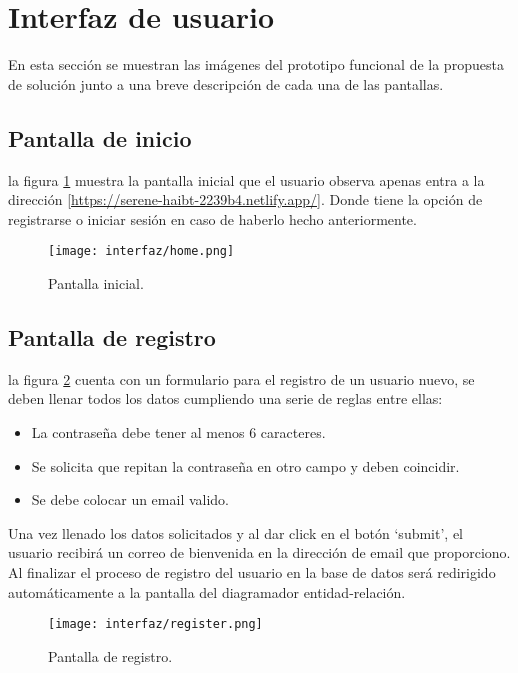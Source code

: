 \section{Interfaz de usuario}

En esta sección se muestran las imágenes del prototipo funcional de la propuesta de solución junto a una breve descripción de cada una de las pantallas.

\subsection{Pantalla de inicio}

la figura \ref{img:app_home} muestra la pantalla inicial que el usuario observa apenas entra a la dirección \ref{https://serene-haibt-2239b4.netlify.app/}. Donde tiene la opción de registrarse o iniciar sesión en caso de haberlo hecho anteriormente.

\begin{figure}[H]
    \centering
    \texttt{[image: interfaz/home.png]}
    \caption{Pantalla inicial.}
    \label{img:app_home}
\end{figure}

\subsection{Pantalla de registro}

la figura \ref{img:app_register} cuenta con un formulario para el registro de un usuario nuevo, se deben llenar todos los datos cumpliendo una serie de reglas entre ellas:

\begin{itemize}
    \item La contraseña debe tener al menos 6 caracteres.
    \item Se solicita que repitan la contraseña en otro campo y deben coincidir.
    \item Se debe colocar un email valido.
\end{itemize}

Una vez llenado los datos solicitados y al dar click en el botón `submit', el usuario recibirá un correo de bienvenida en la dirección de email que proporciono. Al finalizar el proceso de registro del usuario en la base de datos será redirigido automáticamente a la pantalla del diagramador entidad-relación.

\begin{figure}[H]
    \centering
    \texttt{[image: interfaz/register.png]}
    \caption{Pantalla de registro.}
    \label{img:app_register}
\end{figure}

